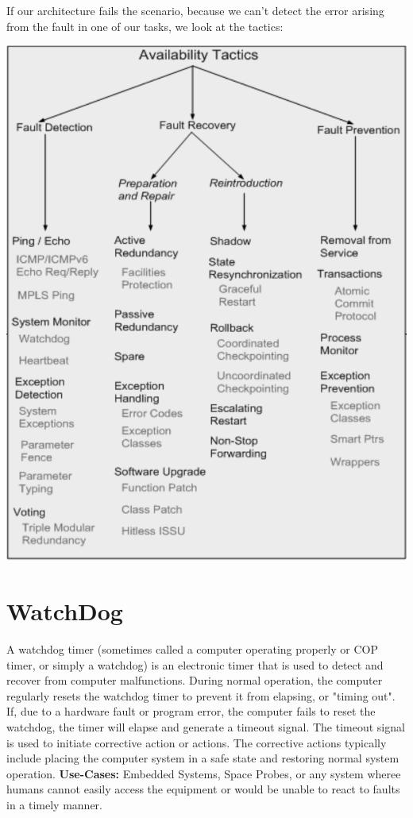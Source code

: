 \documentclass[a4paper]{report}
\begin{document}
If our architecture fails the scenario, because we can't detect the error arising from the fault in one of our tasks, we look at the tactics:
\begin{center}
\includegraphics[scale=0.6]{abcdefg.png}
\end{center}

\section{WatchDog}

A watchdog timer (sometimes called a computer operating properly or COP timer, or simply a watchdog) is an electronic timer that is used to detect and recover from computer malfunctions. During normal operation, the computer regularly resets the watchdog timer to prevent it from elapsing, or "timing out". If, due to a hardware fault or program error, the computer fails to reset the watchdog, the timer will elapse and generate a timeout signal. The timeout signal is used to initiate corrective action or actions. The corrective actions typically include placing the computer system in a safe state and restoring normal system operation.\newline
\textbf{Use-Cases: } Embedded Systems, Space Probes, or any system wheree humans cannot easily access the equipment or would be unable to react to faults in a timely manner.
\end{document}
